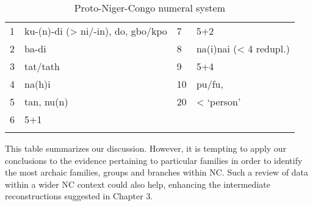 \begin{table}
\caption{\label{tab:4:41}Proto-Niger-Congo numeral system}


\begin{tabularx}{\textwidth}{XlXl}
\lsptoprule

1 & ku-(n)-di (> ni/-in), do, gbo/kpo & 7 & 5+2\\
2 & ba-di & 8 & na(i)nai (< 4 redupl.)\\
3 & tat/tath & 9 & 5+4\\
4 & na(h)i & 10 & pu/fu, \\
5 & tan, nu(n) & 20 & < ‘person’\\
6 & 5+1 &  & \\
\lspbottomrule
\end{tabularx}
\end{table}
This table summarizes our discussion. However, it is tempting to apply our conclusions to the evidence pertaining to particular families in order to identify the most archaic families, groups and branches within NC. Such a review of data within a wider NC context could also help, enhancing the intermediate reconstructions suggested in Chapter 3.
